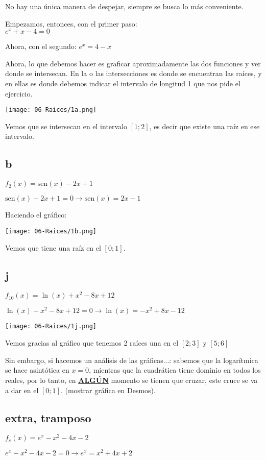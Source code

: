 \documentclass[11pt]{article}
\def\sen{\mathrm{sen}}
\begin{document}
	No hay una única manera de despejar, siempre se busca lo más conveniente.
	
	Empezamos, entonces, con el primer paso:\\
	$e^x+x-4=0$
	
	Ahora, con el segundo: $e^x=4-x$
	
	Ahora, lo que debemos hacer es graficar aproximadamente las dos funciones y ver donde se intersecan. En la o las intersecciones es donde se encuentran las raíces, y en ellas es donde debemos indicar el intervalo de longitud 1 que nos pide el ejercicio.
	
	\texttt{[image: 06-Raices/1a.png]}
	
	Vemos que se intersecan en el intervalo $[1; 2]$, es decir que existe una raíz en ese intervalo.
	
	\subsection{b}
	$f_2(x)=\sen(x)-2x+1$
	
	$\sen(x)-2x+1=0 \rightarrow \sen(x)=2x-1$
	
	Haciendo el gráfico:
	
	\texttt{[image: 06-Raices/1b.png]}
	
	Vemos que tiene una raíz en el $[0; 1]$.
	
	\subsection{j}
	$f_{10}(x)=\ln(x)+x^2-8x+12$
	
	$\ln(x)+x^2-8x+12=0 \rightarrow \ln(x)=-x^2+8x-12$
	
	\texttt{[image: 06-Raices/1j.png]}
	
	Vemos gracias al gráfico que tenemos 2 raíces una en el $[2; 3]$ y $[5; 6]$
	
	Sin embargo, si hacemos un análisis de las gráficas...: sabemos que la logarítmica se hace asintótica en $x=0$, mientras que la cuadrática tiene dominio en todos los reales, por lo tanto, en \textbf{\underline{ALGÚN}} momento se tienen que cruzar, este cruce se va a dar en el $[0; 1]$. (mostrar gráfica en Desmos).
	
	\subsection{extra, tramposo}
	$f_e(x)=e^x-x^2-4x-2$
	
	$e^x-x^2-4x-2=0 \rightarrow e^x=x^2+4x+2$
	
\end{document}
